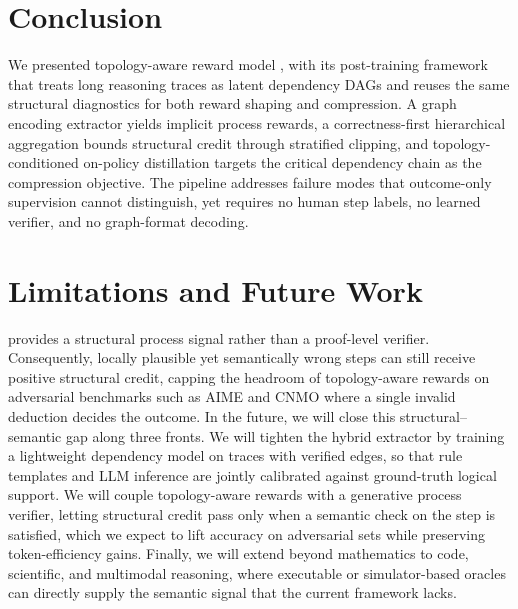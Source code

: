 \section{Conclusion}
\label{sec:conclusion}

We presented topology-aware reward model \method, with its post-training framework \framework that treats long reasoning traces as latent dependency DAGs and reuses the same structural diagnostics for both reward shaping and compression. A graph encoding extractor yields implicit process rewards, a correctness-first hierarchical aggregation bounds structural credit through stratified clipping, and topology-conditioned on-policy distillation targets the critical dependency chain as the compression objective. The pipeline addresses failure modes that outcome-only supervision cannot distinguish, yet requires no human step labels, no learned verifier, and no graph-format decoding.


\section{Limitations and Future Work}
\label{sec:limitations_future}
\method provides a structural process signal rather than a proof-level verifier. Consequently, locally plausible yet semantically wrong steps can still receive positive structural credit, capping the headroom of topology-aware rewards on adversarial benchmarks such as AIME and CNMO where a single invalid deduction decides the outcome.
In the future, we will close this structural--semantic gap along three fronts. We will tighten the hybrid extractor by training a lightweight dependency model on traces with verified edges, so that rule templates and LLM inference are jointly calibrated against ground-truth logical support. We will couple topology-aware rewards with a generative process verifier, letting structural credit pass only when a semantic check on the step is satisfied, which we expect to lift accuracy on adversarial sets while preserving token-efficiency gains. Finally, we will extend \method beyond mathematics to code, scientific, and multimodal reasoning, where executable or simulator-based oracles can directly supply the semantic signal that the current framework lacks.
